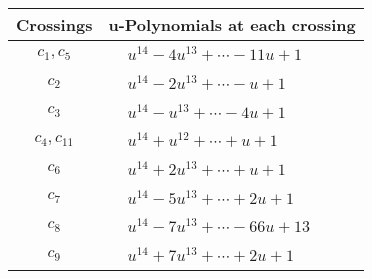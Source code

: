 \documentclass[1p]{elsarticle_modified}
\theoremstyle{definition}
\begin{document}
\begin{tabular}{m{50pt}|m{274pt}}
Crossings & \hspace{64pt}u-Polynomials at each crossing \\
\hline $$\begin{aligned}c_{1},c_{5}\end{aligned}$$&$\begin{aligned}
&u^{14}-4 u^{13}+\cdots-11 u+1
\end{aligned}$\\
\hline $$\begin{aligned}c_{2}\end{aligned}$$&$\begin{aligned}
&u^{14}-2 u^{13}+\cdots- u+1
\end{aligned}$\\
\hline $$\begin{aligned}c_{3}\end{aligned}$$&$\begin{aligned}
&u^{14}- u^{13}+\cdots-4 u+1
\end{aligned}$\\
\hline $$\begin{aligned}c_{4},c_{11}\end{aligned}$$&$\begin{aligned}
&u^{14}+u^{12}+\cdots+u+1
\end{aligned}$\\
\hline $$\begin{aligned}c_{6}\end{aligned}$$&$\begin{aligned}
&u^{14}+2 u^{13}+\cdots+u+1
\end{aligned}$\\
\hline $$\begin{aligned}c_{7}\end{aligned}$$&$\begin{aligned}
&u^{14}-5 u^{13}+\cdots+2 u+1
\end{aligned}$\\
\hline $$\begin{aligned}c_{8}\end{aligned}$$&$\begin{aligned}
&u^{14}-7 u^{13}+\cdots-66 u+13
\end{aligned}$\\
\hline $$\begin{aligned}c_{9}\end{aligned}$$&$\begin{aligned}
&u^{14}+7 u^{13}+\cdots+2 u+1
\end{aligned}$\\

\end{tabular}
\end{document}
